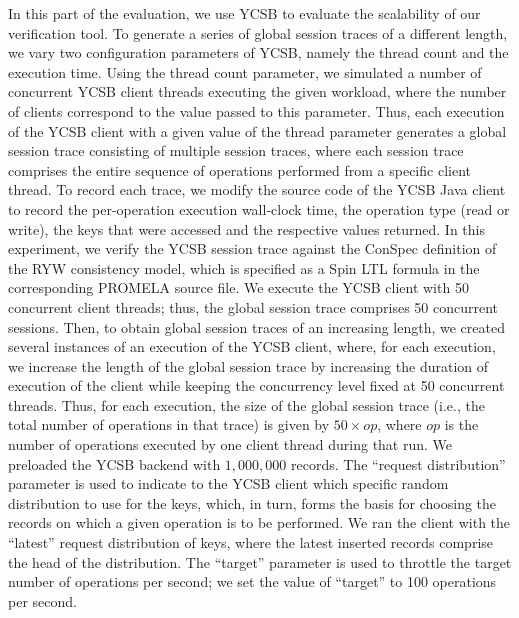 \documentclass[journal,compsoc]{IEEEtran}
\begin{document}
In this part of the evaluation, we use YCSB to evaluate the scalability of our verification tool. To generate a series of global session traces of a different length, we vary two configuration parameters of YCSB, namely the thread count and the execution time.  %
 Using the thread count parameter, we simulated a number of concurrent YCSB client threads executing the given workload, where the number of clients correspond to the value passed to this parameter. Thus, each execution of the YCSB client with a given value of the thread parameter generates a global session trace consisting of multiple session traces, where each session trace comprises the entire sequence of operations performed from a specific client thread. To record each trace, we modify the source code of the YCSB Java client to record the per-operation execution wall-clock time, the operation type (read or write), the keys that were accessed and the respective values returned. 
 In this experiment, we verify the YCSB session  trace against the ConSpec definition of the RYW consistency model, which is specified as a Spin LTL formula in the corresponding  PROMELA source file.  
 We execute the YCSB client with 50 concurrent client threads; thus, the global session  trace comprises 50 concurrent sessions. 
 Then, to obtain global session traces of an increasing length, we created several instances of an execution of the YCSB client, where, for each execution, we increase the length of the global session trace by increasing the  duration of execution of the client while keeping the concurrency level fixed at 50 concurrent threads. Thus, for each execution, the size of the global session trace (i.e., the total number of  operations in that trace) is given by $50 \times op$,  where $op$ is the number of operations executed by one client thread during that run. 
   We  preloaded the YCSB backend with $1,000,000$ records.  The ``request distribution'' parameter is used to indicate to the YCSB client which specific random distribution to use for the keys, which, in turn, forms the basis for choosing the records on which a given operation is to be performed. We ran the client with the ``latest'' request distribution of keys, where the latest inserted records comprise the head of the distribution. The  ``target'' parameter is used to throttle  the target number of operations per second; we set the value of ``target'' to 100  operations per second. 
\end{document}
